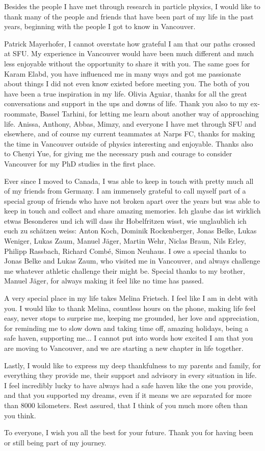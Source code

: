 Besides the people I have met through research in particle physics, I would like to thank many of the people and friends that have been part of my life in the past years, beginning with the people I got to know in Vancouver. 

Patrick Mayerhofer, I cannot overstate how grateful I am that our paths crossed at SFU. My experience in Vancouver would have been much different and much less enjoyable without the opportunity to share it with you. 
The same goes for Karam Elabd, you have influenced me in many ways and got me passionate about things I did not even know existed before meeting you.
The both of you have been a true inspiration in my life.
Olivia Aguiar, thanks for all the great conversations and support in the ups and downs of life. 
Thank you also to my ex-roommate, Bassel Tarhini, for letting me learn about another way of approaching life. 
Anissa, Anthony, Abbas, Mimzy, and everyone I have met through SFU and elsewhere, and of course my current teammates at Narps FC, thanks for making the time in Vancouver outside of physics interesting and enjoyable. 
Thanks also to Chenyi Yue, for giving me the necessary push and courage to consider Vancouver for my PhD studies in the first place. 

Ever since I moved to Canada, I was able to keep in touch with pretty much all of my friends from Germany. 
I am immensely grateful to call myself part of a special group of friends who have not broken apart over the years but was able to keep in touch and collect and share amazing memories.
Ich glaube das ist wirklich etwas Besonderes und ich will dass ihr Hobelfritzen wisst, wie unglaublich ich euch zu schätzen weiss: 
Anton Koch, Dominik Rockenberger, Jonas Belke, Lukas Weniger, Lukas Zaum, Manuel Jäger, Martin Wehr, Niclas Braun, Nils Erley, Philipp Rassbach, Richard Combé, Simon Neuhaus.
I owe a special thanks to Jonas Belke and Lukas Zaum, who visited me in Vancouver,  and always challenge me whatever athletic challenge their might be. 
Special thanks to my brother, Manuel Jäger, for always making it feel like no time has passed. 


A very special place in my life takes Melina Frietsch. 
I feel like I am in debt with you. 
I would like to thank Melina, countless hours on the phone, making life feel easy, never stops to surprise me, keeping me grounded, her love and appreciation, for reminding me to slow down and taking time off, amazing holidays, being a safe haven, supporting me...
I cannot put into words how excited I am that you are moving to Vancouver, and we are starting a new chapter in life together.

Lastly, I would like to express my deep thankfulness to my parents and family, for everything they provide me, their support and advisory in every situation in life. 
I feel incredibly lucky to have always had a safe haven like the one you provide, and that you supported my dreams, even if it means we are separated for more than 8000 kilometers. Rest assured, that I think of you much more often than you think.

To everyone, I wish you all the best for your future. Thank you for having been or still being part of my journey. 

